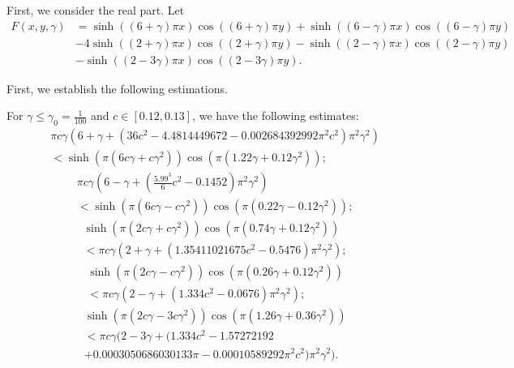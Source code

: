 \documentclass[12pt]{amsart}
\begin{document}
First, we consider the real part. Let
\begin{align}
    F(x,y,\gamma)&=\sinh((6+\gamma)\pi x)\cos((6+\gamma)\pi y)+\sinh((6-\gamma)\pi
x)\cos((6-\gamma)\pi y)\\\nonumber
&-4\sinh((2+\gamma)\pi x)\cos((2+\gamma)\pi y)-\sinh((2-\gamma)\pi
x)\cos((2-\gamma)\pi y)\\\nonumber
&-\sinh((2-3\gamma)\pi x)\cos((2-3\gamma)\pi y).
\end{align}

First, we establish the following estimations. 
\begin{lemma} \label{Lemmafive}
For $\gamma\leq\gamma_{0}=\frac{1}{100}$ and $c\in [0.12,0.13]$, 
we have the following estimates:
\begin{align} \label{identity1}
 &\pi c\gamma(6+\gamma+(36c^{2}-4.4814449672-0.002684392992\pi^{2}c^{2})\pi
^{2}\gamma^{2})\\\nonumber
&<\sinh(\pi(6c\gamma+c\gamma^{2}))\cos(\pi(1.22\gamma
+0.12\gamma^{2}));   
\end{align}
\begin{align}
  &\pi c\gamma(6-\gamma+(\frac{5.99^{3}}{6}c^{2}-0.1452)\pi^{2}\gamma^{2}%
)\\\nonumber
&<\sinh(\pi(6c\gamma-c\gamma^{2}))\cos(\pi(0.22\gamma-0.12\gamma^{2}));  
\end{align}
\begin{align} \label{identity3}
&\sinh(\pi(2c\gamma+c\gamma^{2}))\cos(\pi(0.74\gamma+0.12\gamma^{2}))\\\nonumber
&<\pi
c\gamma(2+\gamma+(1.35411021675c^{2}-0.5476)\pi^{2}\gamma^{2});
\end{align}
\begin{align}
&\sinh(\pi(2c\gamma-c\gamma^{2}))\cos(\pi(0.26\gamma+0.12\gamma^{2}))\\\nonumber
&<\pi
c\gamma(2-\gamma+(1.334c^{2}-0.0676)\pi^{2}\gamma^{2});
\end{align}
\begin{align}
& \sinh(\pi(2c\gamma-3c\gamma^{2}))\cos(\pi(1.26\gamma+0.36\gamma^{2}))\\\nonumber
&<\pi
c\gamma(2-3\gamma+(1.334c^{2}-1.57272192\\\nonumber
&+0.0003050686030133\pi
-0.00010589292\pi^{2}c^{2})\pi^{2}\gamma^{2}).  
\end{align}
\end{lemma}
\end{document}
